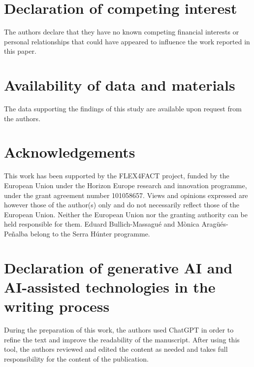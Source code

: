 \documentclass[preprint,12pt]{elsarticle}
\begin{document}
\section*{Declaration of competing interest}
The authors declare that they have no known competing financial interests or personal relationships that could have appeared to influence the work reported in this paper.

\section*{Availability of data and materials}
The data supporting the findings of this study are available upon request from the authors.

\section*{Acknowledgements}
This work has been supported by the FLEX4FACT project, funded by the European Union under the Horizon Europe research and innovation programme, under the grant agreement number 101058657. Views and opinions expressed are however those of the author(s) only and do not necessarily reflect those of the European Union. Neither the European Union nor the granting authority can be held responsible for them. Eduard Bullich-Massagué and M\`{o}nica Arag\"{u}\'{e}s-Pe\~{n}alba belong to the Serra Húnter programme.



\section*{Declaration of generative AI and AI-assisted technologies in the writing process}
During the preparation of this work, the authors used ChatGPT in order to refine the text and improve the readability of the manuscript. After using this tool, the authors reviewed and edited the content as needed and takes full responsibility for the content of the publication.


\end{document}
